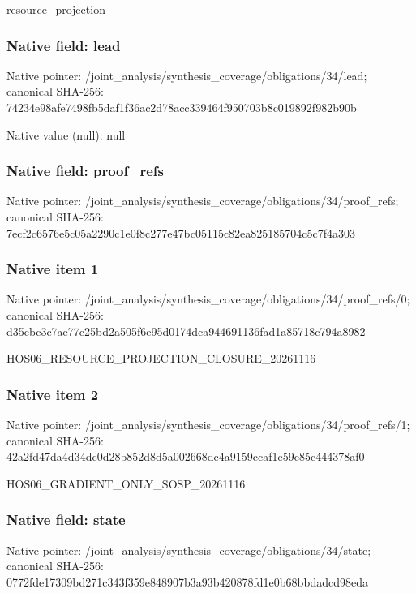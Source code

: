 \documentclass[10pt,a4paper]{article}
\begin{document}
\begingroup\raggedright\sloppy resource\_\allowbreak{}projection\par\endgroup

\subsubsection{Native field: lead}
Native pointer: /joint\_\allowbreak{}analysis/synthesis\_\allowbreak{}coverage/obligations/34/lead; canonical SHA-256: 74234e98afe7498fb5daf1f36ac2d78acc339464f950703b8c019892f982b90b

Native value (null): null

\subsubsection{Native field: proof\_\allowbreak{}refs}
Native pointer: /joint\_\allowbreak{}analysis/synthesis\_\allowbreak{}coverage/obligations/34/proof\_\allowbreak{}refs; canonical SHA-256: 7ecf2c6576e5c05a2290c1e0f8c277e47bc05115c82ea825185704c5c7f4a303

\subsubsection{Native item 1}
Native pointer: /joint\_\allowbreak{}analysis/synthesis\_\allowbreak{}coverage/obligations/34/proof\_\allowbreak{}refs/0; canonical SHA-256: d35cbc3c7ae77c25bd2a505f6e95d0174dca944691136fad1a85718c794a8982

\begingroup\raggedright\sloppy HOS06\_\allowbreak{}RESOURCE\_\allowbreak{}PROJECTION\_\allowbreak{}CLOSURE\_\allowbreak{}20261116\par\endgroup

\subsubsection{Native item 2}
Native pointer: /joint\_\allowbreak{}analysis/synthesis\_\allowbreak{}coverage/obligations/34/proof\_\allowbreak{}refs/1; canonical SHA-256: 42a2fd47da4d34dc0d28b852d8d5a002668dc4a9159ccaf1e59c85c444378af0

\begingroup\raggedright\sloppy HOS06\_\allowbreak{}GRADIENT\_\allowbreak{}ONLY\_\allowbreak{}SOSP\_\allowbreak{}20261116\par\endgroup

\subsubsection{Native field: state}
Native pointer: /joint\_\allowbreak{}analysis/synthesis\_\allowbreak{}coverage/obligations/34/state; canonical SHA-256: 0772fde17309bd271c343f359e848907b3a93b420878fd1e0b68bbdadcd98eda
\end{document}
